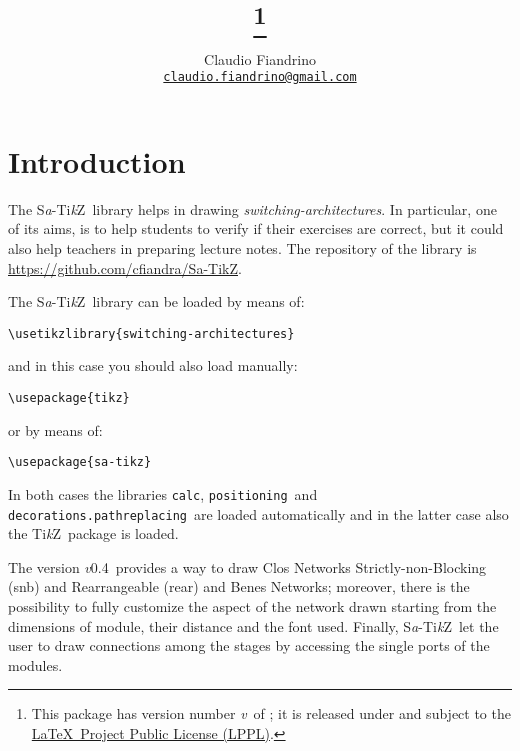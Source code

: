 \documentclass{ltxdoc} %
\title{\saTikZ\footnote{This package has version number \textit{v}\version\ of \versiondate; it is released under and subject to the \href{http://www.latex-project.org/lppl/}{\LaTeX\ Project Public License (LPPL)}.}}
\author{Claudio Fiandrino \\ \small\href{mailto:claudio.fiandrino@gmail.com}{\texttt{claudio.fiandrino@gmail.com}}}
\date{\versiondate}
\newcommand\Tikz{Ti\textit kZ}
\newcommand{\saTikZ}{\textsc S\textit a-\Tikz}
\newcommand{\version}{0.4}
\begin{document}
\maketitle
\tableofcontents

\section*{Introduction}
The \saTikZ\ library helps in drawing \emph{switching-architectures}. In particular, one of its aims, is to help students to verify if their exercises are correct, but it could also help teachers in preparing lecture notes. The repository of the library is \href{https://github.com/cfiandra/Sa-TikZ}{https://github.com/cfiandra/Sa-TikZ}.

The \saTikZ\ library can be loaded by means of:
\begin{flushleft}
\verb|\usetikzlibrary{|\bgroup\color{red!75!black}\verb|switching-architectures|\egroup\verb|}|
\end{flushleft}
and in this case you should also load manually:
\begin{flushleft}
\verb|\usepackage{|\bgroup\color{red!75!black}\verb|tikz|\egroup\verb|}|
\end{flushleft}
or by means of:
\begin{flushleft}
\verb|\usepackage{|\bgroup\color{red!75!black}\verb|sa-tikz|\egroup\verb|}|
\end{flushleft}
In both cases the libraries \bgroup\color{red!75!black}\verb|calc|\egroup{}, \bgroup\color{red!75!black}\verb|positioning|\egroup\ and \bgroup\color{red!75!black}\verb|decorations.pathreplacing|\egroup\ are loaded automatically and in the latter case also the \Tikz\ package is loaded.

The version \textit{v}\version\ provides a way to draw Clos Networks Strictly-non-Blocking (snb) and Rearrangeable (rear) and Benes Networks; moreover, there is the possibility to fully customize the aspect of the network drawn starting from the dimensions of module, their distance and the font used. Finally, \saTikZ\ let the user to draw connections among the stages by accessing the single ports of the modules.
\end{document}
